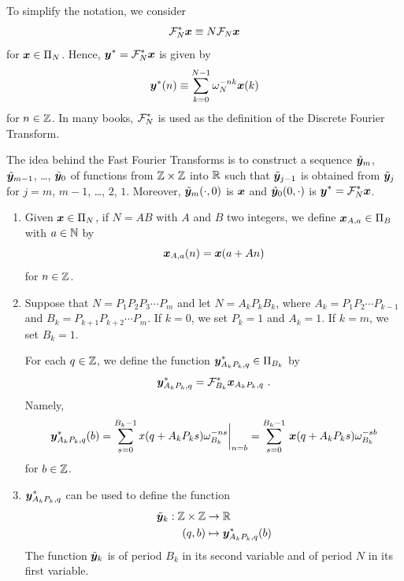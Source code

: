 To simplify the notation, we consider
\[
\mathcal{F}^\ast_N \bm{x} \equiv N \mathcal{F}_N \bm{x}
\]
for $\bm{x}\in \Pi_N$.  Hence,
$\displaystyle \bm{y}^\ast = \mathcal{F}^\ast_N \bm{x}$ is given by
\[
\bm{y}^\ast(n) \equiv \sum_{k=0}^{N-1} \omega_N^{-nk} \bm{x}(k)
\]
for $n \in \mathbb{Z}$.  In many books, $\displaystyle \mathcal{F}^\ast_N$ is used as
the definition of the Discrete Fourier Transform.

The idea behind the Fast Fourier Transforms is to construct a sequence
$\tilde{\bm{y}}_m$, $\tilde{\bm{y}}_{m-1}$, \ldots, $\tilde{\bm{y}}_0$ of functions from
$\mathbb{Z}\times \mathbb{Z}$ into $\mathbb{R}$ such that $\tilde{\bm{y}}_{j-1}$ is obtained from
$\tilde{\bm{y}}_j$ for $j=m$, $m-1$, \ldots , $2$, $1$.  Moreover,
$\tilde{\bm{y}}_m(\cdot,0)$ is $\bm{x}$ and $\tilde{\bm{y}}_0(0,\cdot)$ is
$\displaystyle \bm{y}^\ast = \mathcal{F}^\ast_N \bm{x}$.

\begin{defn}
\begin{enumerate}
\item Given $\bm{x} \in \Pi_N$, if $N=AB$ with $A$ and $B$ two
integers, we define $\bm{x}_{A,a} \in \Pi_B$ with $a\in \mathbb{N}$ by
\[
\bm{x}_{A,a}(n) = \bm{x}(a+An)
\]
for $n \in \mathbb{Z}$.
\item Suppose that $N = P_1 P_2 P_3 \cdots P_m$ and let
$N = A_k  P_k B_k$, where $A_k=P_1 P_2 \cdots P_{k-1}$ and
$B_k=P_{k+1} P_{k+2} \cdots P_m$.  If $k=0$, we set $P_k = 1$ and
$A_k = 1$.  If $k=m$, we set $B_k=1$. 

For each $q \in \mathbb{Z}$, we define the function
$\displaystyle \bm{y}^\ast_{A_k P_k,q} \in \Pi_{B_k}$ by
\[
\bm{y}^\ast_{A_k P_k,q} = \mathcal{F}^\ast_{B_k} \bm{x}_{A_k P_k,q} \ .
\]
Namely,
\begin{equation} \label{FFTstep}
\bm{y}^\ast_{A_k P_k,q}(b) =
\sum_{s=0}^{B_k-1} x(q +A_kP_k s) \omega_{B_k}^{-ns} \bigg|_{n=b}
= \sum_{s=0}^{B_k-1}\, \bm{x}(q+A_k P_k s) \omega_{B_k}^{-s b}
\end{equation}
for $b \in \mathbb{Z}$.
\item $\displaystyle \bm{y}^\ast_{A_k P_k, q}$ can be used to define
the function 
\begin{align*}
\tilde{\bm{y}}_k: \mathbb{Z} \times \mathbb{Z} & \rightarrow \mathbb{R} \\
(q,b) &\mapsto \bm{y}^\ast_{A_k P_k,q}(b)
\end{align*}
The function $\tilde{\bm{y}}_k$ is of period $B_k$ in its second variable
and of period $N$ in its first variable.
\end{enumerate}
\end{defn}


